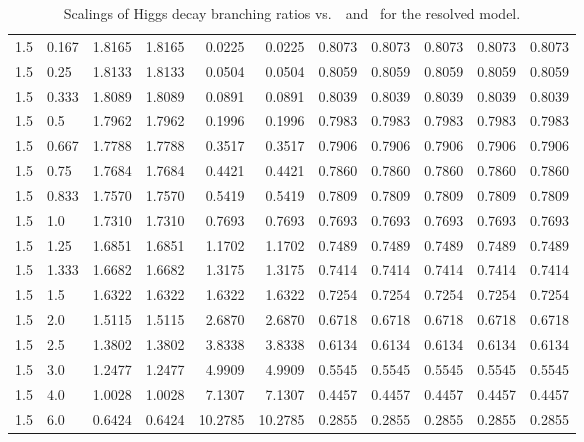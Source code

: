 \begin{table}[h!]
\begin{tabular}{ll rrrrrrrrr}
   1.5  & 0.167  & 1.8165 & 1.8165 & 0.0225 & 0.0225 & 0.8073 & 0.8073 & 0.8073 & 0.8073 & 0.8073 \\
   1.5  & 0.25   & 1.8133 & 1.8133 & 0.0504 & 0.0504 & 0.8059 & 0.8059 & 0.8059 & 0.8059 & 0.8059 \\
   1.5  & 0.333  & 1.8089 & 1.8089 & 0.0891 & 0.0891 & 0.8039 & 0.8039 & 0.8039 & 0.8039 & 0.8039 \\
   1.5  & 0.5    & 1.7962 & 1.7962 & 0.1996 & 0.1996 & 0.7983 & 0.7983 & 0.7983 & 0.7983 & 0.7983 \\
   1.5  & 0.667  & 1.7788 & 1.7788 & 0.3517 & 0.3517 & 0.7906 & 0.7906 & 0.7906 & 0.7906 & 0.7906 \\
   1.5  & 0.75   & 1.7684 & 1.7684 & 0.4421 & 0.4421 & 0.7860 & 0.7860 & 0.7860 & 0.7860 & 0.7860 \\
   1.5  & 0.833  & 1.7570 & 1.7570 & 0.5419 & 0.5419 & 0.7809 & 0.7809 & 0.7809 & 0.7809 & 0.7809 \\
   1.5  & 1.0    & 1.7310 & 1.7310 & 0.7693 & 0.7693 & 0.7693 & 0.7693 & 0.7693 & 0.7693 & 0.7693 \\
   1.5  & 1.25   & 1.6851 & 1.6851 & 1.1702 & 1.1702 & 0.7489 & 0.7489 & 0.7489 & 0.7489 & 0.7489 \\
   1.5  & 1.333  & 1.6682 & 1.6682 & 1.3175 & 1.3175 & 0.7414 & 0.7414 & 0.7414 & 0.7414 & 0.7414 \\
   1.5  & 1.5    & 1.6322 & 1.6322 & 1.6322 & 1.6322 & 0.7254 & 0.7254 & 0.7254 & 0.7254 & 0.7254 \\
   1.5  & 2.0    & 1.5115 & 1.5115 & 2.6870 & 2.6870 & 0.6718 & 0.6718 & 0.6718 & 0.6718 & 0.6718 \\
   1.5  & 2.5    & 1.3802 & 1.3802 & 3.8338 & 3.8338 & 0.6134 & 0.6134 & 0.6134 & 0.6134 & 0.6134 \\
   1.5  & 3.0    & 1.2477 & 1.2477 & 4.9909 & 4.9909 & 0.5545 & 0.5545 & 0.5545 & 0.5545 & 0.5545 \\
   1.5  & 4.0    & 1.0028 & 1.0028 & 7.1307 & 7.1307 & 0.4457 & 0.4457 & 0.4457 & 0.4457 & 0.4457 \\
   1.5  & 6.0    & 0.6424 & 0.6424 & 10.2785 & 10.2785 & 0.2855 & 0.2855 & 0.2855 & 0.2855 & 0.2855 \\\hline
    \end{tabular}
    \caption{Scalings of Higgs decay branching ratios vs.\ \Ct\ and \ for the resolved model.}\label{tab:brscalingK6_1p5}
 \end{table}


